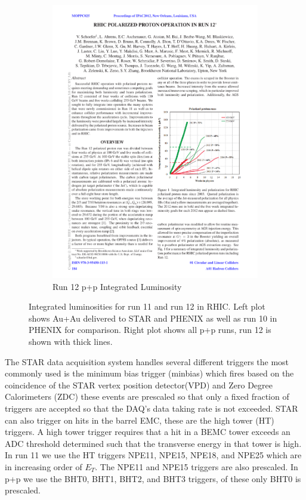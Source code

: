 \begin{figure}[htbp]
\begin{subfigure}{0.5\textwidth}
        \includegraphics[width=\textwidth]{Plots/NPE/Run12_Lum.pdf}
        \caption{Run 12 p+p Integrated Luminosity}
        \label{fig:Lumb}
    \end{subfigure}
\caption[RHIC Integrated Luminosities in Run11 and Run12]{Integrated luminosities for run 11 and run 12 in RHIC. Left plot shows Au+Au delivered to STAR and PHENIX as well as run 10 in PHENIX for comparison. Right plot shows all p+p runs, run 12 is shown with thick lines.}
\label{fig:RunLum}
\end{figure}

The STAR data acquisition system handles several different triggers the most commonly used is the minimum bias trigger (minbias) which fires based on the coincidence of the STAR vertex position detector(VPD) and Zero Degree Calorimeters (ZDC) these events are prescaled so that only a fixed fraction of triggers are accepted so that the DAQ's data taking rate is not exceeded. STAR can also trigger on hits in the barrel EMC, these are the high tower (HT) triggers. A high tower trigger requires that a hit in a BEMC tower exceeds an ADC threshold determined such that the transverse energy in that tower is high. In run 11 we use the HT triggers NPE11, NPE15, NPE18, and NPE25 which are in increasing order of $E_{T}$. The NPE11 and NPE15 triggers are also prescaled. In p+p we use the BHT0, BHT1, BHT2, and BHT3 triggers, of these only BHT0 is prescaled.

